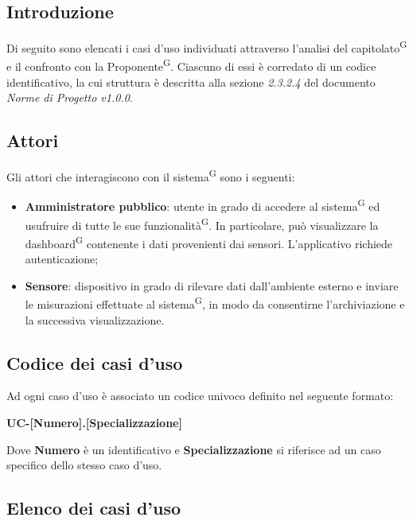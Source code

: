 \documentclass[8pt]{article}
\newcommand{\glossterm}[1]{#1\textsuperscript{G}} %
\begin{document}
\subsection{Introduzione}
Di seguito sono elencati i casi d'uso individuati attraverso l'analisi del \glossterm{capitolato} e il
confronto con la \glossterm{Proponente}. Ciascuno di essi è corredato di un codice identificativo, la cui
struttura è descritta alla sezione \textit{2.3.2.4} del documento \textit{Norme di Progetto v1.0.0}. %
\subsection{Attori}
Gli attori che interagiscono con il \glossterm{sistema} sono i seguenti:
\begin{itemize}
    \item \textbf{Amministratore pubblico}: utente in grado di accedere al \glossterm{sistema} ed usufruire di tutte le sue \glossterm{funzionalità}. In particolare, può visualizzare la \glossterm{dashboard} contenente i dati provenienti dai sensori. L'applicativo richiede autenticazione;
    \item \textbf{Sensore}: dispositivo in grado di rilevare dati dall'ambiente esterno e inviare le misurazioni effettuate al \glossterm{sistema}, in modo da consentirne l'archiviazione e la successiva visualizzazione.
\end{itemize}
\clearpage
\subsection{Codice dei casi d'uso}
Ad ogni caso d'uso è associato un codice univoco definito nel seguente formato:
\begin{center}
    \textbf{UC-[Numero].[Specializzazione]}
\end{center}
Dove \textbf{Numero} è un identificativo e \textbf{Specializzazione} si riferisce ad un caso specifico
dello stesso caso d'uso.
\subsection{Elenco dei casi d'uso}

\setcounter{uc}{-1}
\newcommand{\ucnumber}{\stepcounter{uc}\arabic{uc}}
\setcounter{specone}{0}
\newcommand{\speconenumber}{\stepcounter{specone}\arabic{specone}}
\setcounter{spectwo}{0}
\newcommand{\spectwonumber}{\stepcounter{spectwo}\arabic{spectwo}}
\end{document}
